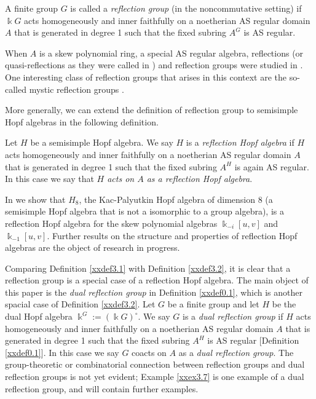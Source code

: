 \begin{definition}
\label{xxdef3.1}
A finite group $G$ is called a {\it  reflection group} 
(in the noncommutative setting) if $\Bbbk G$ acts homogeneously and 
inner faithfully on a noetherian AS regular domain $A$ that is 
generated in degree 1 such that the fixed subring $A^G$ is AS 
regular.
\end{definition}

When $A$ is a skew polynomial ring, a special AS regular algebra,
reflections (or quasi-reflections as they were called in  \cite[Definition 2.2]{KKZ1}) and 
reflection groups were studied in \cite{KKZ1, KKZ2}. One interesting class 
of reflection groups that arises in this context are the so-called mystic reflection groups \cite{KKZ2}. 

More generally, we can extend the definition of reflection group to semisimple Hopf algebras in the following definition.

\begin{definition}
\label{xxdef3.2}
Let $H$ be a semisimple Hopf algebra. We say $H$ is a {\it 
reflection Hopf algebra} if $H$ acts homogeneously and 
inner faithfully on 
a noetherian AS regular domain $A$ that is 
generated in degree 1 such that the fixed
subring $A^H$ is again AS regular. In this case we say
that {\it $H$ acts on $A$ as a reflection Hopf algebra}. 
\end{definition}

In \cite[Examples 7.4 and 7.6]{KKZ3} we show that $H_8$, the 
Kac-Palyutkin Hopf algebra of dimension 8 (a semisimple Hopf 
algebra that is not a isomorphic to a group algebra), is a 
reflection Hopf algebra for the skew polynomial algebras 
$\Bbbk_{-i}[u,v]$ and $\Bbbk_{-1}[u,v]$. Further results on 
the structure and properties of reflection Hopf algebras
are the object of research in progress.

Comparing Definition \ref{xxdef3.1} with Definition \ref{xxdef3.2},
it is clear that a reflection group is a special case of a 
reflection Hopf algebra.  The main object 
of this paper is the {\it dual reflection group} in 
Definition \ref{xxdef0.1}, which is 
another spacial case of Definition \ref{xxdef3.2}. 
Let $G$ be a finite group and let $H$ be the dual Hopf algebra 
$\Bbbk^G:=(\Bbbk G)^\circ$. We say $G$ is a {\it dual reflection group} 
if $H$ acts homogeneously and inner faithfully on a noetherian 
AS regular domain $A$ that is generated in degree 1 such that 
the fixed subring $A^H$ is AS regular [Definition \ref{xxdef0.1}]. 
In this case we say $G$ coacts on $A$ as a {\it dual reflection group}. 
The group-theoretic or 
combinatorial connection between reflection groups and dual 
reflection groups is not yet evident;  Example \ref{xxex3.7} is one example of a dual reflection group, and \cite{KKZ5} will contain further examples.

